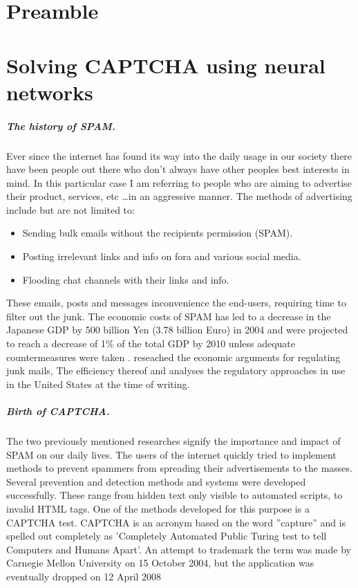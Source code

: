 \documentclass[pdftex,a4paper,12pt,twoside]{report}
\begin{document}
\chapter*{Preamble}
\label{ch:preamble}



\chapter{Solving CAPTCHA using neural networks}
\label{ch:introduction}
\paragraph{The history of SPAM.} 
Ever since the internet has found its way into the daily usage in our society there have been people out there who don't always have other peoples best interests in mind. In this particular case I am referring to people who are aiming to advertise their product, services, etc \ldots in an aggressive manner. The methods of advertising include but are not limited to: \begin{itemize}
\item Sending bulk emails without the recipients permission (SPAM). 
\item Posting irrelevant links and info on fora and various social media.
\item Flooding chat channels with their links and info. 
\end{itemize}
These emails, posts and messages inconvenience the end-users, requiring time to filter out the junk. The economic costs of SPAM has led to a decrease in the Japanese GDP by 500 billion Yen (3.78 billion Euro) in 2004 and were projected to reach a decrease of 1\% of the total GDP by 2010 unless adequate countermeasures were taken \citep{Ukai2007}. \citep{Khong2004} reseached the economic arguments for regulating junk mails, The efficiency thereof and analyses the regulatory approaches in use in the United States at the time of writing.
\paragraph{Birth of CAPTCHA.} 
The two previously mentioned researches signify the importance and impact of SPAM on our daily lives. The users of the internet quickly tried to implement methods to prevent spammers from spreading their advertisements to the masses. Several prevention and detection methods and systems were developed successfully. These range from hidden text only visible to automated scripts, to invalid HTML tags. One of the methods developed for this purpose is a CAPTCHA test. CAPTCHA is an acronym based on the word ''capture'' and is spelled out completely as 'Completely Automated Public Turing test to tell Computers and Humans Apart'. An attempt to trademark  the term was made by Carnegie Mellon University on 15 October 2004, but the application was eventually dropped on 12 April 2008
\end{document}
